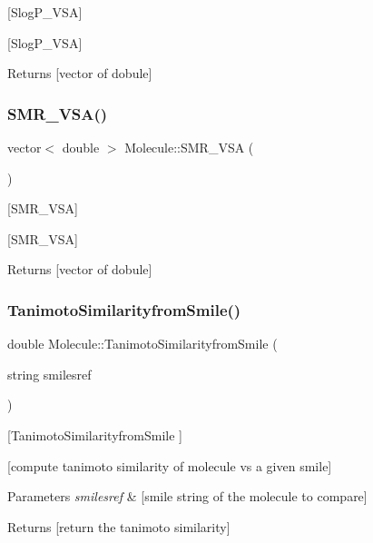 \mbox{[}Slog\+P\+\_\+\+V\+SA\mbox{]} 

\mbox{[}Slog\+P\+\_\+\+V\+SA\mbox{]}

\begin{DoxyReturn}{Returns}
\mbox{[}vector of dobule\mbox{]} 
\end{DoxyReturn}
\mbox{\label{class_molecule_a839c9f1848b3b0c953ca7f4902e86086}} 
\subsubsection{\texorpdfstring{S\+M\+R\+\_\+\+V\+S\+A()}{SMR\_VSA()}}
{\footnotesize\ttfamily vector$<$ double $>$ Molecule\+::\+S\+M\+R\+\_\+\+V\+SA (\begin{DoxyParamCaption}{ }\end{DoxyParamCaption})}



\mbox{[}S\+M\+R\+\_\+\+V\+SA\mbox{]} 

\mbox{[}S\+M\+R\+\_\+\+V\+SA\mbox{]}

\begin{DoxyReturn}{Returns}
\mbox{[}vector of dobule\mbox{]} 
\end{DoxyReturn}
\mbox{\label{class_molecule_a2f83a282a6276fb330b46831a29907d6}} 
\subsubsection{\texorpdfstring{Tanimoto\+Similarityfrom\+Smile()}{TanimotoSimilarityfromSmile()}}
{\footnotesize\ttfamily double Molecule\+::\+Tanimoto\+Similarityfrom\+Smile (\begin{DoxyParamCaption}\item[{string}]{smilesref }\end{DoxyParamCaption})}



\mbox{[}Tanimoto\+Similarityfrom\+Smile \mbox{]} 

\mbox{[}compute tanimoto similarity of molecule vs a given smile\mbox{]}


\begin{DoxyParams}{Parameters}
{\em smilesref} & \mbox{[}smile string of the molecule to compare\mbox{]} \\
\hline
\end{DoxyParams}
\begin{DoxyReturn}{Returns}
\mbox{[}return the tanimoto similarity\mbox{]} 
\end{DoxyReturn}
\mbox{\label{class_molecule_abf1fa50884e0dc53421416c3731689db}} 
